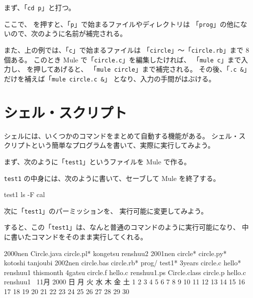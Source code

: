まず、「\texttt{cd p}」と打つ。

\begin{progls}
\end{progls}

ここで、  を押すと、「\texttt{p}」で始まるファイルやディレクトリは
「\texttt{prog}」の他にないので、次のように名前が補完される。

\begin{progls}
\end{progls}

また、上の例では、「\texttt{c}」で始まるファイルは 
「\texttt{circle}」〜「\texttt{circle.rb}」まで 8 個ある。
このとき Mule で「\texttt{circle.c}」を編集したければ、
「\texttt{mule c}」まで入力し、 を押してあげると、
「\texttt{mule circle}」まで補完される。
その後、「\texttt{.c \&}」だけを補えば「\texttt{mule circle.c \&}」
となり、入力の手間がはぶける。

\section{シェル・スクリプト}

シェルには、いくつかのコマンドをまとめて自動する機能がある。
シェル・スクリプトという簡単なプログラムを書いて、実際に実行してみよう。

まず、次のように「\texttt{test1}」というファイルを Mule で作る。

\begin{progls}
%
\end{progls}

\texttt{test1} の中身には、次のように書いて、セーブして Mule を終了する。

\begin{progls2}{test1}
ls -F
cal
\end{progls2}

次に「\texttt{test1}」のパーミッションを、
実行可能に変更してみよう。

\begin{progls}
%
\end{progls}

すると、この「\texttt{test1}」は、なんと普通のコマンドのように実行可能になり、
中に書いたコマンドをそのまま実行してくれる。

\begin{progls}
2000nen         Circle.java     circle.pl*      kongetsu        renshuu2
2001nen         circle*         circle.py*      kotoshi         tanjoubi
2002nen         circle.bas      circle.rb*      prog/           test1*
3years          circle.c        hello*          renshuu1        thismonth
4gatsu          circle.f        hello.c         renshuu1.ps
Circle.class    circle.p        hello.c~        renshuu1~
     11月 2000
日 月 火 水 木 金 土
          1  2  3  4
 5  6  7  8  9 10 11
12 13 14 15 16 17 18
19 20 21 22 23 24 25
26 27 28 29 30

%
\end{progls}

